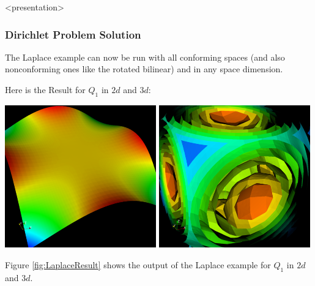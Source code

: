\begin{frame}<presentation>
\frametitle<presentation>{Dirichlet Problem Solution}
The Laplace example can now be run with all conforming spaces (and
also nonconforming ones like the rotated bilinear) and in any space
dimension.

Here is the Result for $Q_1$ in $2d$ and $3d$:
\begin{center}
\includegraphics[width=0.49\textwidth]{./EPS/q1laplace}\hfill
\includegraphics[width=0.49\textwidth]{./EPS/q1laplace3d}
\end{center}
\end{frame}

Figure \ref{fig:LaplaceResult} shows the output of the Laplace example
for $Q_1$ in $2d$ and $3d$. 

